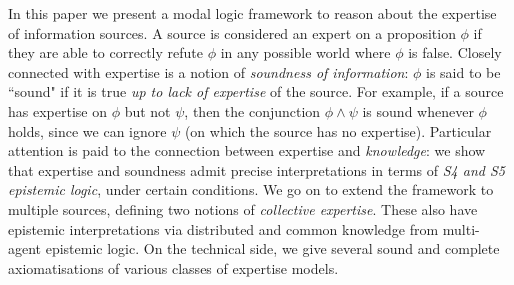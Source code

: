 In this paper we present a modal logic framework to reason about the expertise
of information sources. A source is considered an expert on a proposition
$\phi$
if they are able to correctly refute $\phi$ in any possible world where $\phi$ is
false. Closely connected with expertise is a notion of \emph{soundness of
information}: $\phi$ is said to be ``sound" if it is true \emph{up to lack of
expertise} of the source. For example, if a source has expertise on $\phi$ but
not $\psi$, then the conjunction $\phi \land \psi$ is sound whenever $\phi$
holds, since we can ignore $\psi$ (on which the source has no expertise).
%
Particular attention is paid to the connection between expertise and
\emph{knowledge}: we show that expertise and soundness admit precise
interpretations in terms of \emph{S4 and S5 epistemic logic}, under certain
conditions.
%
We go on to extend the framework to multiple sources, defining two notions of
\emph{collective expertise}. These also have epistemic interpretations via
distributed and common knowledge from multi-agent epistemic logic.
%
On the technical side, we give several sound and complete axiomatisations of
various classes of expertise models.
